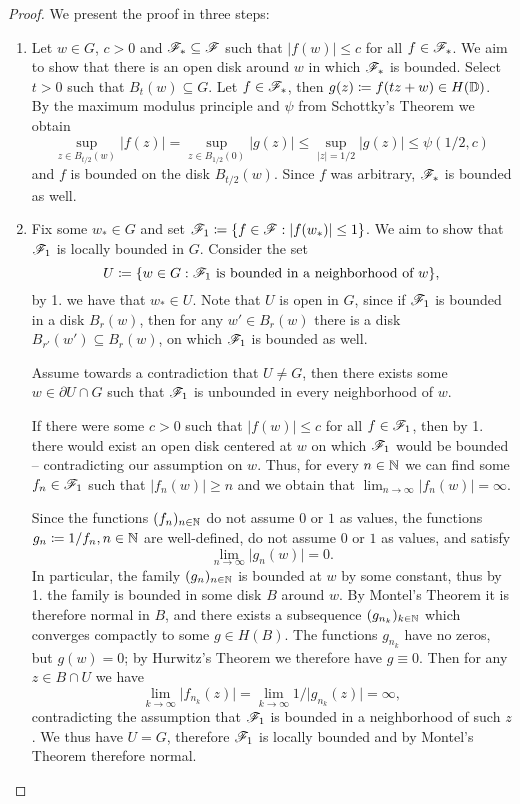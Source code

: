 \begin{proof}
    We present the proof in three steps:
    \begin{enumerate}
        \item Let $w \in G$, $c > 0$ and $\mathscr{F}_* \subseteq \mathscr{F}$ such that $\vert f(w) \vert \leq c$ for all $f \in \mathscr{F}_*$. We aim to show that there is an open disk around $w$ in which $\mathscr{F}_*$ is bounded. Select $t > 0$ such that $B_t(w) \subseteq G$. Let $f \in \mathscr{F}_*$, then $g(z) \coloneqq f(tz + w) \in H(\mathbb{D})$. By the maximum modulus principle and $\psi$ from Schottky's Theorem we obtain
        $$ \sup_{z \in B_{t/2}(w)} \vert f(z) \vert = \sup_{z \in B_{1/2}(0)} \vert g(z) \vert \leq \sup_{\vert z \vert = 1/2} \vert g(z) \vert \leq \psi(1/2, c) $$
        and $f$ is bounded on the disk $B_{t/2}(w)$. Since $f$ was arbitrary, $\mathscr{F}_*$ is bounded as well.

        \item Fix some $w_* \in G$ and set $\mathscr{F}_1 \coloneqq \{ f \in \mathscr{F} : \vert f(w_*) \vert \leq 1 \}$. We aim to show that $\mathscr{F}_1$ is locally bounded in $G$. Consider the set
        $$ U \coloneqq \{ w \in G : \mathscr{F}_1 \textrm{ is bounded in a neighborhood of } w \}, $$
        by 1. we have that $w_* \in U$. Note that $U$ is open in $G$, since if $\mathscr{F}_1$ is bounded in a disk $B_r(w)$, then for any $w' \in B_r(w)$ there is a disk $B_{r'}(w') \subseteq B_r(w)$, on which $\mathscr{F}_1$ is bounded as well.
        
        Assume towards a contradiction that $U \neq G$, then there exists some $w \in \partial U \cap G$ such that $\mathscr{F}_1$ is unbounded in every neighborhood of $w$.

        If there were some $c > 0$ such that $\vert f(w) \vert \leq c$ for all $f \in \mathscr{F}_1$, then by 1. there would exist an open disk centered at $w$ on which $\mathscr{F}_1$ would be bounded -- contradicting our assumption on $w$. Thus, for every $n \in \mathbb{N}$ we can find some $f_n \in \mathscr{F}_1$ such that $\vert f_n(w) \vert \geq n$ and we obtain that $\lim_{n \to \infty} \vert f_n(w) \vert = \infty$.
        
        Since the functions $(f_n)_{n \in \mathbb{N}}$ do not assume $0$ or $1$ as values, the functions $g_n \coloneqq 1 / f_n, n \in \mathbb{N}$ are well-defined, do not assume $0$ or $1$ as values, and satisfy
        $$ \lim_{n \to \infty} \vert g_n(w) \vert = 0. $$
        In particular, the family $(g_n)_{n \in \mathbb{N}}$ is bounded at $w$ by some constant, thus by 1. the family is bounded in some disk $B$ around $w$. By Montel's Theorem it is therefore normal in $B$, and there exists a subsequence $(g_{n_k})_{k \in \mathbb{N}}$ which converges compactly to some $g \in H(B)$. The functions $g_{n_k}$ have no zeros, but $g(w) = 0$; by Hurwitz's Theorem we therefore have $g \equiv 0$. Then for any $z \in B \cap U$ we have
        $$ \lim_{k \to \infty} \vert f_{n_k}(z) \vert = \lim_{k \to \infty} 1 / \vert g_{n_k}(z) \vert = \infty, $$
        contradicting the assumption that $\mathscr{F}_1$ is bounded in a neighborhood of such $z$. We thus have $U = G$, therefore $\mathscr{F}_1$ is locally bounded and by Montel's Theorem therefore normal.


\end{enumerate}
\end{proof}
